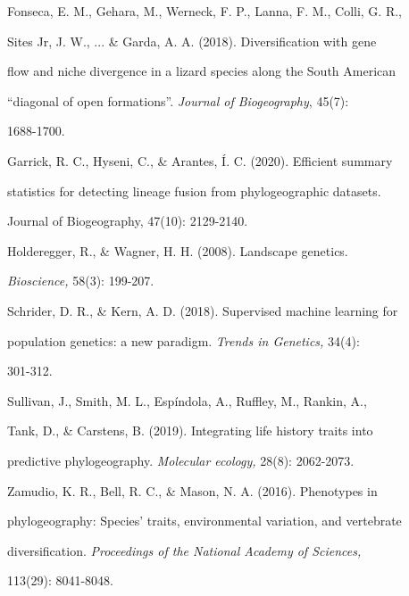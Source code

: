 \documentclass[10pt,twoside]{article}
\numberwithin{equation}{section}
\begin{document}
Fonseca, E. M., Gehara, M., Werneck, F. P., Lanna, F. M., Colli, G. R.,

Sites Jr, J. W., ... \& Garda, A. A. (2018). Diversification with gene

flow and niche divergence in a lizard species along the South American

``diagonal of open formations''. \emph{Journal of Biogeography}, 45(7):

1688-1700.



Garrick, R. C., Hyseni, C., \& Arantes, Í. C. (2020). Efficient summary

statistics for detecting lineage fusion from phylogeographic datasets.

Journal of Biogeography, 47(10): 2129-2140.



Holderegger, R., \& Wagner, H. H. (2008). Landscape genetics.

\emph{Bioscience,} 58(3): 199-207.



Schrider, D. R., \& Kern, A. D. (2018). Supervised machine learning for

population genetics: a new paradigm. \emph{Trends in Genetics,} 34(4):

301-312.



Sullivan, J., Smith, M. L., Espíndola, A., Ruffley, M., Rankin, A.,

Tank, D., \& Carstens, B. (2019). Integrating life history traits into

predictive phylogeography. \emph{Molecular ecology,} 28(8): 2062-2073.



Zamudio, K. R., Bell, R. C., \& Mason, N. A. (2016). Phenotypes in

phylogeography: Species' traits, environmental variation, and vertebrate

diversification. \emph{Proceedings of the National Academy of Sciences,}

113(29): 8041-8048.
\end{document}
